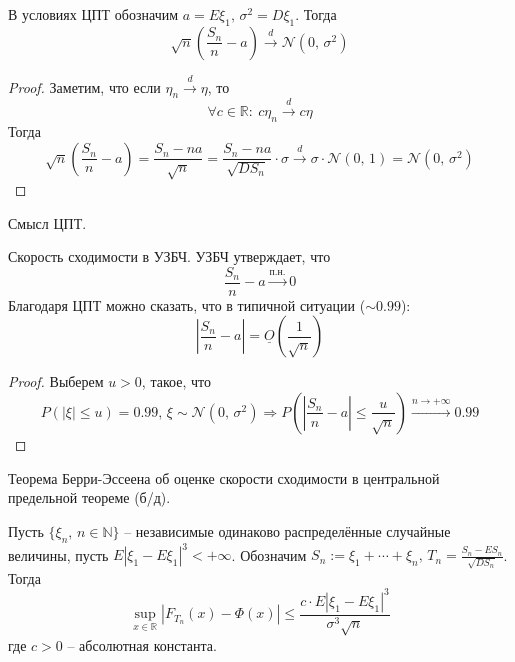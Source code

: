 \begin{corollary}
	В условиях ЦПТ обозначим $a = E\xi_1,\, \sigma^2 = D\xi_1$. Тогда
	\[\sqrt{n}\left(\frac{S_n}{n} - a\right) \stackrel{d}{\to} \mathcal{N}(0,\, \sigma^2)\]
\end{corollary}

\begin{proof}
	Заметим, что если $\eta_n \stackrel{d}{\to} \eta$, то
	\[\forall c \in \mathbb{R}:\: c\eta_n \stackrel{d}{\to} c\eta\]
	Тогда
	\[\sqrt{n}\left(\frac{S_n}{n} - a\right) = \frac{S_n - na}{\sqrt{n}} = \frac{S_n - na}{\sqrt{DS_n}}\cdot\sigma \stackrel{d}{\to} \sigma\cdot\mathcal{N}(0,\,1) = \mathcal{N}(0,\,\sigma^2)\]
\end{proof}

\begin{note}
	Смысл ЦПТ.

	Скорость сходимости в УЗБЧ. УЗБЧ утверждает, что
	\[\frac{S_n}{n} - a \stackrel{\text{п.н.}}{\to} 0\]
	Благодаря ЦПТ можно сказать, что в типичной ситуации ($\sim 0.99$):
	\[\left|\frac{S_n}{n} - a\right| = \underline{O}\left(\frac{1}{\sqrt{n}}\right)\]

\end{note}

\begin{proof}
	Выберем $u > 0$, такое, что
	\[P(|\xi| \leq u) = 0.99,\, \xi \sim \mathcal{N}(0,\,\sigma^2) \Rightarrow P\left(\left|\frac{S_n}{n} - a\right| \leq \frac{u}{\sqrt{n}}\right) \stackrel{n \to +\infty}{\to} 0.99\]
\end{proof}

\begin{theorem}
	Теорема Берри-Эссеена об оценке скорости сходимости в центральной предельной теореме (б/д).

	Пусть $\{\xi_n,\, n \in \mathbb{N}\}$ -- независимые одинаково распределённые случайные величины, пусть $E|\xi_1 - E\xi_1|^3 < +\infty$. Обозначим $S_n := \xi_1 + \cdots + \xi_n,\, T_n = \frac{S_n - ES_n}{\sqrt{DS_n}}$. Тогда
	\[\sup_{x \in \mathbb{R}}|F_{T_n}(x) - \Phi(x)| \leq \frac{c \cdot E|\xi_1 - E\xi_1|^3}{\sigma^3\sqrt{n}}\]
	где $c > 0$ -- абсолютная константа.
\end{theorem}
